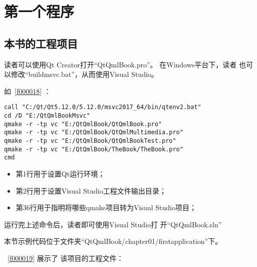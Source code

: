 ﻿




%

\FloatBarrier
\section{
第一个程序
}\label{s100210}


\FloatBarrier
\subsection{
本书的工程项目
}\label{ss001u10}


读者可以使用Qt Creator打开“QtQmlBook.pro”。
在Windows平台下，读者
也可以修改“build\underline{\hspace{0.5em}}msvc.bat”，从而使用Visual Studio。

如\lstlistingname\ \ref{f000018} ：


\FloatBarrier
\begin{lstlisting}[label=f000018,
caption=GoodLuck,
title=\lstlistingname\ \thelstlisting
]
call "C:/Qt/Qt5.12.0/5.12.0/msvc2017_64/bin/qtenv2.bat"
cd /D "E:/QtQmlBookMsvc"
qmake -r -tp vc "E:/QtQmlBook/QtQmlBook.pro"
qmake -r -tp vc "E:/QtQmlBook/QtQmlMultimedia.pro"
qmake -r -tp vc "E:/QtQmlBook/QtQmlBookTest.pro"
qmake -r -tp vc "E:/QtQmlBook/TheBook/TheBook.pro"
cmd
\end{lstlisting}          %



\begin{itemize}

\item 第1行用于设置Qt运行环境；
\item 第2行用于设置Visual Studio工程文件输出目录；
\item 第3\raisebox{0.16ex}{\sourcefonttwo\~{}}6行用于指明将哪些qmake项目转为Visual Studio项目；

\end{itemize}

运行完上述命令后，读者即可使用Visual Studio打
开“QtQmlBook.sln”

本节示例代码位于文件夹“QtQmlBook/chapter01/firstapplication”下。

\lstlistingname\ \ref{f000019}
展示了
该项目的工程文件：

